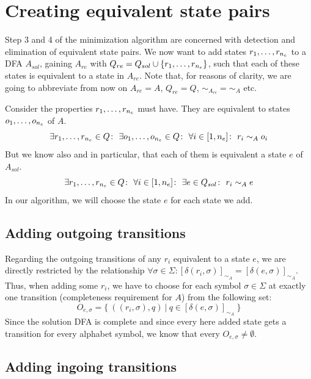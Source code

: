 \section{Creating equivalent state pairs}

Step 3 and 4 of the minimization algorithm are concerned with detection and elimination of equivalent state pairs. We now want to add states $r_1,\ldots,r_{n_e}$ to a DFA $A_{sol}$, gaining $A_{re}$ with $Q_{re} = Q_{sol} \cup \{r_1,\ldots,r_{n_e}\}$, such that each of these states is equivalent to a state in $A_{re}$. Note that, for reasons of clarity, we are going to abbreviate from now on $A_{re} = A$, $Q_{re} = Q$, $\sim_{A_{re}} = \sim_A$ etc.


Consider the properties $r_1,\ldots,r_{n_e}$ must have. They are equivalent to states $o_1,\ldots,o_{n_e}$ of $A$.
\[
\exists r_1,\ldots,r_\nEQ \in Q\colon\ \exists o_1,\ldots,o_\nEQ \in Q\colon\ \forall i \in [1,\nEQ] \colon\ r_i \sim_A o_i
\]
But we know also and in particular, that each of them is equivalent a state $e$ of $A_{sol}$.
\[
	\exists r_1,\ldots,r_\nEQ \in Q\colon\ \forall i \in [1,\nEQ] \colon\ \exists e \in Q_{sol}\colon\ r_i \sim_A e
\]
In our algorithm, we will choose the state $e$ for each state we add.

\subsection{Adding outgoing transitions}

Regarding the outgoing transitions of any $r_i$ equivalent to a state $e$, we are directly restricted by the relationship $\forall \sigma \in \Sigma \colon [\delta(r_i, \sigma)]_{\sim_A} = [\delta(e, \sigma)]_{\sim_A}$. Thus, when adding some $r_i$, we have to choose for each symbol $\sigma \in \Sigma$ at exactly one transition (completeness requirement for $A$) from the following set:
\[
	O_{e,\sigma} = \{\ ((r_i, \sigma), q)\ |\ q \in [\delta(e, \sigma)]_{\sim_A}\ \}
\]
Since the solution DFA is complete and since every here added state gets a transition for every alphabet symbol, we know that every $O_{e,\sigma} \neq \emptyset$.


\subsection{Adding ingoing transitions}

